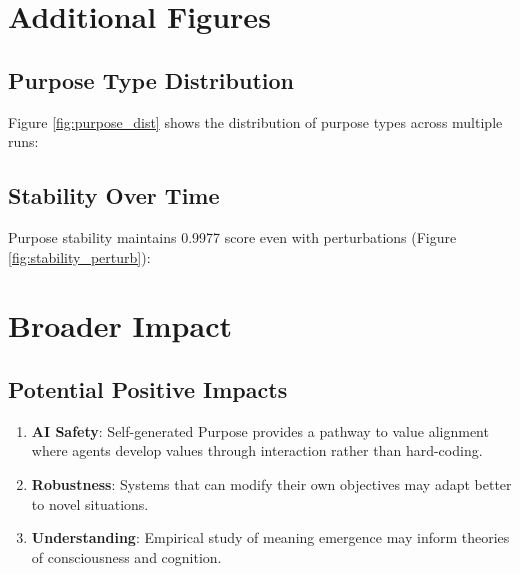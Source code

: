 \documentclass{article}
\begin{document}
\section{Additional Figures}

\subsection{Purpose Type Distribution}

Figure \ref{fig:purpose_dist} shows the distribution of purpose types across multiple runs:


\subsection{Stability Over Time}

Purpose stability maintains 0.9977 score even with perturbations (Figure \ref{fig:stability_perturb}):


\section{Broader Impact}

\subsection{Potential Positive Impacts}
\begin{enumerate}
    \item \textbf{AI Safety}: Self-generated Purpose provides a pathway to value alignment where agents develop values through interaction rather than hard-coding.
    \item \textbf{Robustness}: Systems that can modify their own objectives may adapt better to novel situations.
    \item \textbf{Understanding}: Empirical study of meaning emergence may inform theories of consciousness and cognition.
\end{enumerate}
\end{document}
